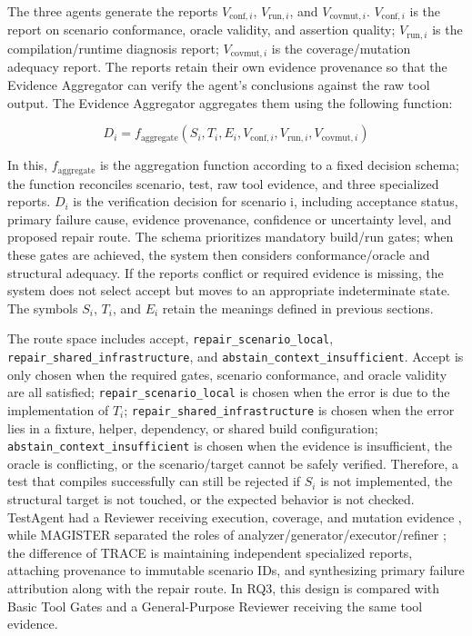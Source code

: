 \documentclass[pdflatex,sn-basic,Numbered,iicol]{sn-jnl}
\begin{document}
The three agents generate the reports $V_{\mathrm{conf},i}$, $V_{\mathrm{run},i}$, and $V_{\mathrm{covmut},i}$. $V_{\mathrm{conf},i}$ is the report on scenario conformance, oracle validity, and assertion quality; $V_{\mathrm{run},i}$ is the compilation/runtime diagnosis report; $V_{\mathrm{covmut},i}$ is the coverage/mutation adequacy report. The reports retain their own evidence provenance so that the Evidence Aggregator can verify the agent's conclusions against the raw tool output. The Evidence Aggregator aggregates them using the following function:

\begin{equation}
D_i = f_{\mathrm{aggregate}}(S_i,T_i,E_i,V_{\mathrm{conf},i},V_{\mathrm{run},i},V_{\mathrm{covmut},i})
\label{eq:evidence-aggregation}
\end{equation}

In this, $f_{\mathrm{aggregate}}$ is the aggregation function according to a fixed decision schema; the function reconciles scenario, test, raw tool evidence, and three specialized reports. $D_i$ is the verification decision for scenario i, including acceptance status, primary failure cause, evidence provenance, confidence or uncertainty level, and proposed repair route. The schema prioritizes mandatory build/run gates; when these gates are achieved, the system then considers conformance/oracle and structural adequacy. If the reports conflict or required evidence is missing, the system does not select accept but moves to an appropriate indeterminate state. The symbols $S_i$, $T_i$, and $E_i$ retain the meanings defined in previous sections.

The route space includes accept, \texttt{repair\_scenario\_local}, \texttt{repair\_shared\_infrastructure}, and \texttt{abstain\_context\_insufficient}. Accept is only chosen when the required gates, scenario conformance, and oracle validity are all satisfied; \texttt{repair\_scenario\_local} is chosen when the error is due to the implementation of $T_i$; \texttt{repair\_shared\_infrastructure} is chosen when the error lies in a fixture, helper, dependency, or shared build configuration; \texttt{abstain\_context\_insufficient} is chosen when the evidence is insufficient, the oracle is conflicting, or the scenario/target cannot be safely verified. Therefore, a test that compiles successfully can still be rejected if $S_i$ is not implemented, the structural target is not touched, or the expected behavior is not checked. TestAgent had a Reviewer receiving execution, coverage, and mutation evidence \cite{bib23}, while MAGISTER separated the roles of analyzer/generator/executor/refiner \cite{bib31}; the difference of TRACE is maintaining independent specialized reports, attaching provenance to immutable scenario IDs, and synthesizing primary failure attribution along with the repair route. In RQ3, this design is compared with Basic Tool Gates and a General-Purpose Reviewer receiving the same tool evidence.
\end{document}
